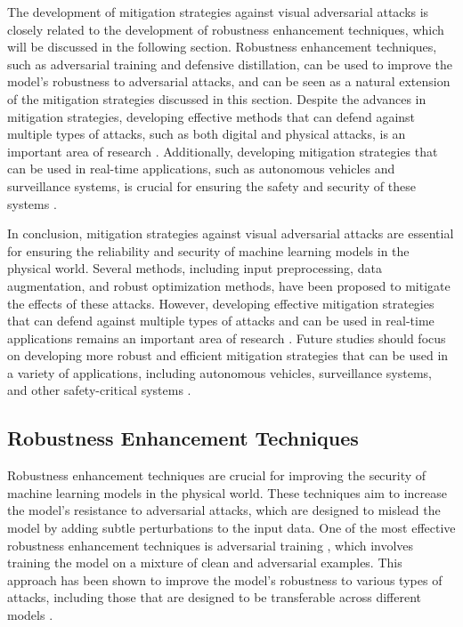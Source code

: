 \documentclass[11pt,a4paper]{article}
\begin{document}
The development of mitigation strategies against visual adversarial attacks is closely related to the development of robustness enhancement techniques, which will be discussed in the following section. Robustness enhancement techniques, such as adversarial training and defensive distillation, can be used to improve the model's robustness to adversarial attacks, and can be seen as a natural extension of the mitigation strategies discussed in this section. Despite the advances in mitigation strategies, developing effective methods that can defend against multiple types of attacks, such as both digital and physical attacks, is an important area of research \cite{doi:10.1049/cit2.12028}. Additionally, developing mitigation strategies that can be used in real-time applications, such as autonomous vehicles and surveillance systems, is crucial for ensuring the safety and security of these systems \cite{doi:10.1109/access.2024.3418614}.

In conclusion, mitigation strategies against visual adversarial attacks are essential for ensuring the reliability and security of machine learning models in the physical world. Several methods, including input preprocessing, data augmentation, and robust optimization methods, have been proposed to mitigate the effects of these attacks. However, developing effective mitigation strategies that can defend against multiple types of attacks and can be used in real-time applications remains an important area of research \cite{doi:10.1007/s10462-024-10841-z}. Future studies should focus on developing more robust and efficient mitigation strategies that can be used in a variety of applications, including autonomous vehicles, surveillance systems, and other safety-critical systems \cite{doi:10.1038/s41598-025-15753-8}.


\subsection{Robustness Enhancement Techniques}


Robustness enhancement techniques are crucial for improving the security of machine learning models in the physical world. These techniques aim to increase the model's resistance to adversarial attacks, which are designed to mislead the model by adding subtle perturbations to the input data. One of the most effective robustness enhancement techniques is adversarial training \cite{doi:10.1145/3128572.3140444}, which involves training the model on a mixture of clean and adversarial examples. This approach has been shown to improve the model's robustness to various types of attacks, including those that are designed to be transferable across different models \cite{doi:10.1109/cvpr.2019.00284}.
\end{document}
